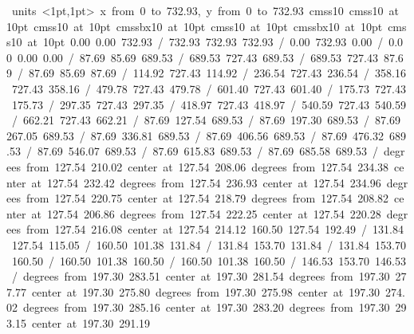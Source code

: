 \hbox{\beginpicture
\setcoordinatesystem units <1pt,1pt>
\setplotarea x from 0 to 732.93, y from 0 to 732.93
\setlinear
\font\picfont cmss10\picfont
\font\picfont cmss10 at 10pt\picfont
\font\picfont cmss10 at 10pt\picfont
\font\picfont cmssbx10 at 10pt\picfont
\font\picfont cmss10 at 10pt\picfont
\font\picfont cmssbx10 at 10pt\picfont
\font\picfont cmss10 at 10pt\picfont
\setsolid
{} 0.00 0.00 732.93 /
 732.93 732.93 732.93 /
 0.00 732.93 0.00 /
 0.00 0.00 0.00 /
\setsolid
{} 87.69 85.69 689.53 /
 689.53 727.43 689.53 /
 689.53 727.43 87.69 /
 87.69 85.69 87.69 /
\setsolid
{} 114.92 727.43 114.92 /
\setsolid
{} 236.54 727.43 236.54 /
\setsolid
{} 358.16 727.43 358.16 /
\setsolid
{} 479.78 727.43 479.78 /
\setsolid
{} 601.40 727.43 601.40 /
\setsolid
{} 175.73 727.43 175.73 /
\setsolid
{} 297.35 727.43 297.35 /
\setsolid
{} 418.97 727.43 418.97 /
\setsolid
{} 540.59 727.43 540.59 /
\setsolid
{} 662.21 727.43 662.21 /
\setsolid
{} 87.69 127.54 689.53 /
\setsolid
{} 87.69 197.30 689.53 /
\setsolid
{} 87.69 267.05 689.53 /
\setsolid
{} 87.69 336.81 689.53 /
\setsolid
{} 87.69 406.56 689.53 /
\setsolid
{} 87.69 476.32 689.53 /
\setsolid
{} 87.69 546.07 689.53 /
\setsolid
{} 87.69 615.83 689.53 /
\setsolid
{} 87.69 685.58 689.53 /
 degrees from 127.54 210.02 center at 127.54 208.06
 degrees from 127.54 234.38 center at 127.54 232.42
 degrees from 127.54 236.93 center at 127.54 234.96
 degrees from 127.54 220.75 center at 127.54 218.79
 degrees from 127.54 208.82 center at 127.54 206.86
 degrees from 127.54 222.25 center at 127.54 220.28
 degrees from 127.54 216.08 center at 127.54 214.12
\setsolid
{} 160.50 127.54 192.49 /
\setsolid
{} 131.84 127.54 115.05 /
\setsolid
{} 160.50 101.38 131.84 /
 131.84 153.70 131.84 /
 131.84 153.70 160.50 /
 160.50 101.38 160.50 /
 160.50 101.38 160.50 /
\setsolid
{} 146.53 153.70 146.53 /
 degrees from 197.30 283.51 center at 197.30 281.54
 degrees from 197.30 277.77 center at 197.30 275.80
 degrees from 197.30 275.98 center at 197.30 274.02
 degrees from 197.30 285.16 center at 197.30 283.20
 degrees from 197.30 293.15 center at 197.30 291.19
}
